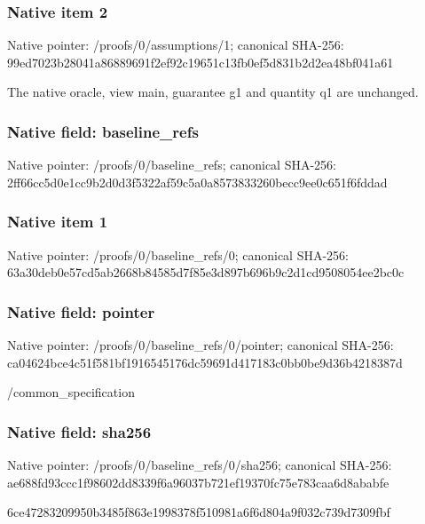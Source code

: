 \documentclass[10pt,a4paper]{article}
\begin{document}
\subsubsection{Native item 2}
Native pointer: /proofs/0/assumptions/1; canonical SHA-256: 99ed7023b28041a86889691f2ef92c19651c13fb0ef5d831b2d2ea48bf041a61

\begingroup\raggedright\sloppy The native oracle,\allowbreak{} view main,\allowbreak{} guarantee g1 and quantity q1 are unchanged.\par\endgroup

\subsubsection{Native field: baseline\_\allowbreak{}refs}
Native pointer: /proofs/0/baseline\_\allowbreak{}refs; canonical SHA-256: 2ff66cc5d0e1cc9b2d0d3f5322af59c5a0a8573833260becc9ee0c651f6fddad

\subsubsection{Native item 1}
Native pointer: /proofs/0/baseline\_\allowbreak{}refs/0; canonical SHA-256: 63a30deb0e57cd5ab2668b84585d7f85e3d897b696b9c2d1cd9508054ee2bc0c

\subsubsection{Native field: pointer}
Native pointer: /proofs/0/baseline\_\allowbreak{}refs/0/pointer; canonical SHA-256: ca04624bce4c51f581bf1916545176dc59691d417183c0bb0be9d36b4218387d

\begingroup\raggedright\sloppy /\allowbreak{}common\_\allowbreak{}specification\par\endgroup

\subsubsection{Native field: sha256}
Native pointer: /proofs/0/baseline\_\allowbreak{}refs/0/sha256; canonical SHA-256: ae688fd93ccc1f98602dd8339f6a96037b721ef19370fc75e783caa6d8ababfe

\begingroup\raggedright\sloppy 6ce47283209950b3485f863e1998378f510981a6f6d804a9f032c739d7309fbf\par\endgroup
\end{document}
